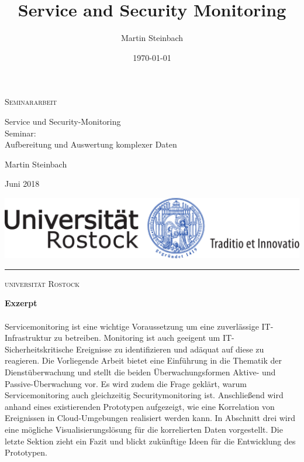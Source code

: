 \documentclass[a4paper,10pt]{scrreprt}
\title{Service and Security Monitoring}
\author{Martin Steinbach}
\date{\today}
\begin{document}
\thispagestyle{empty}
\setcounter{page}{1}
\begin{center}
  
  {\Large \textsc{Seminararbeit}
  
  \vspace{4.25cm}
  
  {\fontsize{22}{22}\selectfont Service und Security-Monitoring\\}
  \vspace{0.75cm}
  {\fontsize{20}{20}\selectfont Seminar:\\\vspace{0.2cm} Aufbereitung und Auswertung 
  komplexer Daten}
}
  
  \vspace{7.25cm}
  
  {\Large Martin Steinbach
    
    \vspace{.15cm}
    
    Juni 2018}
  
  \vspace{1.5cm}
  
  
  \includegraphics[scale=0.5]{img/siegel}
  
  \vspace{0.5cm}
  
  \rule{.7\textwidth}{.40pt}
  
  \vspace{.5cm}
  
  {\large\textsc{universität Rostock}}
    
    \vspace{.15cm}
        
\end{center}
\quad  \addtocounter{page}{-1}
\newpage

\vspace*{\fill}
\textbf{Exzerpt}\\\\
    Servicemonitoring ist eine wichtige Voraussetzung um eine zuverlässige 
    IT-Infrastruktur zu betreiben. Monitoring ist auch geeigent um IT-Sicherheitskritische
    Ereignisse zu identifizieren und adäquat auf diese zu reagieren. Die Vorliegende
    Arbeit bietet eine Einführung in die Thematik der Dienstüberwachung und stellt die
    beiden Überwachungsformen Aktive- und Passive-Überwachung vor. Es wird zudem
    die Frage geklärt, warum Servicemonitoring auch gleichzeitig Securitymonitoring ist.
    Anschließend wird anhand eines existierenden Prototypen aufgezeigt, wie eine 
    Korrelation von Ereignissen in Cloud-Umgebungen realisiert werden kann. In Abschnitt 
    drei wird eine mögliche Visualisierungslösung für die korrelierten Daten vorgestellt. 
    Die letzte Sektion zieht ein Fazit und blickt zukünftige Ideen für die Entwicklung 
    des Prototypen. 
\vspace*{\fill}
\end{document}
